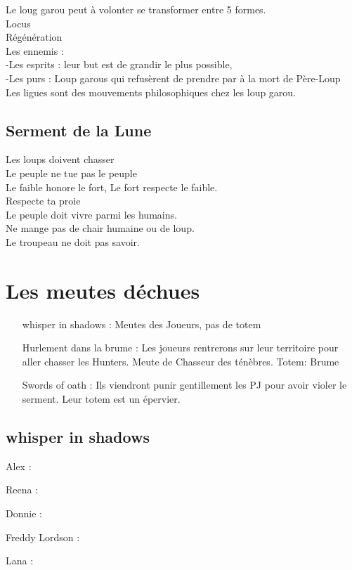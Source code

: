 \documentclass[oneside,12pt]{book}
\begin{document}
\begin{flushleft}
Le loug garou peut à volonter se transformer entre 5 formes.\\ 
Locus\\
Régénération\\
Les ennemis :\\
-Les esprits : leur but est de grandir le plus possible,\\ 
-Les purs : Loup garous qui refusèrent de prendre par à la mort de Père-Loup\\
Les ligues sont des mouvements philosophiques chez les loup garou.\\

\clearpage
\subsection{Serment de la Lune}
Les loups doivent chasser\\
Le peuple ne tue pas le peuple\\
Le faible honore le fort, Le fort respecte le faible.\\
Respecte ta proie\\
Le peuple doit vivre parmi les humains.\\
Ne mange pas de chair humaine ou de loup.\\
Le troupeau ne doit pas savoir.      \\


\section{Les meutes déchues}
\begin{itemize}
\item[whisper in shadows]: Meutes des Joueurs, pas de totem
\item[Hurlement dans la brume]: Les joueurs rentrerons sur leur territoire pour aller chasser les Hunters. Meute de Chasseur des ténèbres. Totem: Brume
\item[Swords of oath]: Ils viendront punir gentillement les PJ pour avoir violer le serment. Leur totem est un épervier. 
\end{itemize}

\subsection{whisper in shadows}
\item[Alex]: 
\item[Reena]: 
\item[Donnie]: 
\item[Freddy Lordson]: 
\item[Lana]: 


\end{flushleft}
\end{document}
